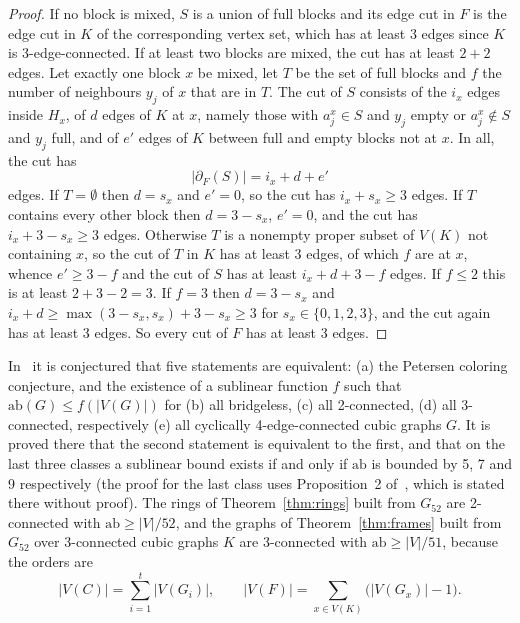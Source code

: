 \documentclass[11pt]{article}
\theoremstyle{definition}
\theoremstyle{remark}
\newcommand{\Gfty}{G_{52}}
\newcommand{\ab}{\mathrm{ab}}
\begin{document}
\begin{proof}
If no block is mixed, $S$ is a union of full blocks and its edge cut in $F$ is the edge cut in $K$ of the
corresponding vertex set, which has at least 3 edges since $K$ is 3-edge-connected. If at least two
blocks are mixed, the cut has at least $2 + 2$ edges. Let exactly one block $x$ be mixed, let $T$ be the set of full blocks
and $f$ the number of neighbours $y_j$ of $x$ that are in $T$. The cut of $S$ consists of the $i_x$
edges inside $H_x$, of $d$ edges of $K$ at $x$, namely those with $a^x_j \in S$ and $y_j$ empty or
$a^x_j \notin S$ and $y_j$ full, and of $e'$ edges of $K$ between full and empty blocks not at $x$.
In all, the cut has
\begin{equation}\label{eq:cutcount}
|\partial_F(S)| = i_x + d + e'
\end{equation}
edges. If $T = \emptyset$ then $d = s_x$ and $e' = 0$, so the cut has $i_x + s_x \ge 3$ edges. If $T$ contains
every other block then $d = 3 - s_x$, $e' = 0$, and the cut has $i_x + 3 - s_x \ge 3$ edges. Otherwise
$T$ is a nonempty proper subset of $V(K)$ not containing $x$, so the cut of $T$ in $K$ has at least 3
edges, of which $f$ are at $x$, whence $e' \ge 3 - f$ and the cut of $S$ has at least $i_x + d + 3 - f$
edges. If $f \le 2$ this is at least $2 + 3 - 2 = 3$. If $f = 3$ then $d = 3 - s_x$ and
$i_x + d \ge \max(3 - s_x, s_x) + 3 - s_x \ge 3$ for $s_x \in \{0,1,2,3\}$, and the cut again has at least 3 edges.
So every cut of $F$ has at least 3 edges.
\end{proof}

In~\cite{MMM2021} it is conjectured that five statements are equivalent: (a) the Petersen
coloring conjecture, and the existence of a sublinear function $f$ such that
$\ab(G) \le f(|V(G)|)$ for (b) all bridgeless, (c) all 2-connected, (d) all 3-connected,
respectively (e) all cyclically 4-edge-connected cubic graphs $G$. It is proved there that the second statement is equivalent to the first, and
that on the last three classes a sublinear bound exists if and only if $\ab$ is bounded by 5, 7
and 9 respectively (the proof for the last class uses Proposition~2 of~\cite{MMM2021}, which is stated
there without proof). The rings of Theorem~\ref{thm:rings} built from $\Gfty$ are 2-connected with
$\ab \ge |V|/52$, and the graphs of Theorem~\ref{thm:frames} built from $\Gfty$ over 3-connected
cubic graphs $K$ are 3-connected with $\ab \ge |V|/51$, because the orders are
\begin{equation}\label{eq:orders}
|V(C)| = \sum_{i=1}^{t} |V(G_i)|, \qquad |V(F)| = \sum_{x \in V(K)} \bigl(|V(G_x)| - 1\bigr).
\end{equation}
\end{document}
